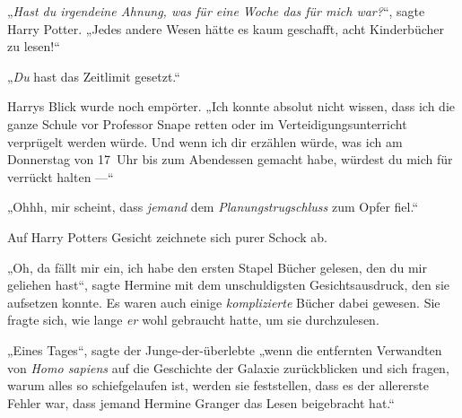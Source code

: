 „\emph{Hast du irgendeine Ahnung, was für eine Woche das für mich war?}“, sagte Harry Potter.
„Jedes andere Wesen hätte es kaum geschafft, acht Kinderbücher zu lesen!“

„\emph{Du} hast das Zeitlimit gesetzt.“

Harrys Blick wurde noch empörter.
„Ich konnte absolut nicht wissen, dass ich die ganze Schule vor Professor Snape retten oder im Verteidigungsunterricht verprügelt werden würde. Und wenn ich dir erzählen würde, was ich am Donnerstag von 17~Uhr bis zum Abendessen gemacht habe, würdest du mich für verrückt halten —“

„Ohhh, mir scheint, dass \emph{jemand} dem \emph{Planungstrugschluss} zum Opfer fiel.“

Auf Harry Potters Gesicht zeichnete sich purer Schock ab.

„Oh, da fällt mir ein, ich habe den ersten Stapel Bücher gelesen, den du mir geliehen hast“, sagte Hermine mit dem unschuldigsten Gesichtsausdruck, den sie aufsetzen konnte. Es waren auch einige \emph{komplizierte} Bücher dabei gewesen. Sie fragte sich, wie lange \emph{er} wohl gebraucht hatte, um sie durchzulesen.

„Eines Tages“, sagte der Junge-der-überlebte „wenn die entfernten Verwandten von \emph{Homo sapiens} auf die Geschichte der Galaxie zurückblicken und sich fragen, warum alles so schiefgelaufen ist, werden sie feststellen, dass es der allererste Fehler war, dass jemand Hermine Granger das Lesen beigebracht hat.“

